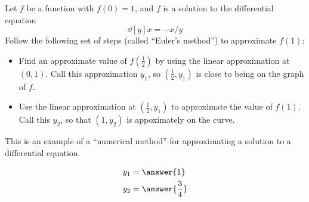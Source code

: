 \documentclass{ximera}
\author{Steven Gubkin}
\begin{document}
\begin{exercise}



Let $f$ be a function with $f(0) = 1$, and $f$ is a solution to the differential equation 
\[
\dd[y]{x} = -x/y
\]
Follow the following set of steps (called ``Euler's method'') to
approximate $f(1)$:
\begin{itemize}
\item Find an approximate value of $f(\frac{1}{2})$ by using the linear approximation at $(0,1)$.  Call this approximation $y_1$, so $(\frac{1}{2},y_1)$ is close to being on the graph of $f$.
\item Use the linear approximation at $(\frac{1}{2}, y_1)$ to approximate the value of $f(1)$.  Call this $y_2$, so that $(1,y_2)$ is appoximately on the curve.
\end{itemize}

This is an example of a ``numerical method'' for approximating a solution to a differential equation.
\begin{prompt}
	\begin{align*}
	y_1 &= \answer{1}\\
	y_2 &= \answer{\frac{3}{4}}
	\end{align*}
\end{prompt}
\end{exercise}
\end{document}
